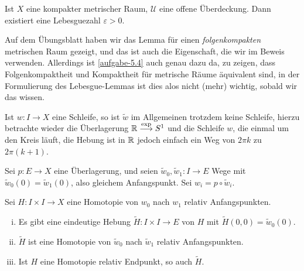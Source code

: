 \begin{lemma*}\label{lm:lebesgue}
    Ist $X$ eine kompakter metrischer Raum,  $\mathcal{U}$ eine offene Überdeckung. Dann existiert eine Lebesguezahl $ε>0$.
\end{lemma*}

\begin{remark*}
    Auf dem Übungsblatt haben wir das Lemma für einen \textit{folgenkompakten} metrischen Raum gezeigt, und das ist auch die Eigenschaft, die wir im Beweis verwenden. Allerdings ist \autoref{aufgabe-5.4} auch genau dazu da, zu zeigen, dass Folgenkompaktheit und Kompaktheit für metrische Räume äquivalent sind, in der Formulierung des Lebesgue-Lemmas ist dies alos nicht (mehr) wichtig, sobald wir das wissen.
\end{remark*}

\begin{remark}
    Ist $w\colon  I \to  X$ eine Schleife, so ist $\tilde{w}$ im Allgemeinen trotzdem keine Schleife, hierzu betrachte wieder die Überlagerung $\mathbb{R} \stackrel{\exp }{\longrightarrow} S^1$ und die Schleife $w$, die einmal um den Kreis läuft, die Hebung ist in $\mathbb{R}$ jedoch einfach ein Weg von $2\pi k$ zu $2\pi(k+1)$.
\end{remark}

\begin{theorem}[Homotopieliftungssatz]\label{thm:homotopieliftungssatz}
    Sei $p\colon  E \to  X$ eine Überlagerung, und seien $\tilde{w}_0, \tilde{w}_1\colon  I \to  E$ Wege mit $\tilde{w}_0(0) = \tilde{w}_1(0)$, also gleichem Anfangspunkt. Sei $w_i = p \circ  \tilde{w}_i$.

    Sei $H\colon  I \times I \to  X$ eine Homotopie von $w_0$ nach $w_1$ relativ Anfangspunkten.

    \begin{enumerate}[i)]
        \item Es gibt eine eindeutige Hebung $\tilde{H}\colon  I \times I \to  E$ von $H$ mit  $\tilde{H}(0,0) = \tilde{w}_0(0)$.
        \item $\tilde{H}$ ist eine Homotopie von $\tilde{w}_0$ nach $\tilde{w}_1$ relativ Anfangspunkten.
        \item Ist $H$ eine Homotopie relativ Endpunkt, so auch  $\tilde{H}$.
    \end{enumerate}
\end{theorem}
